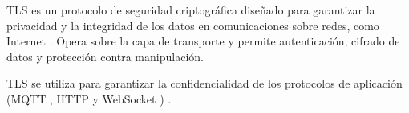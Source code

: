 


TLS es un protocolo de seguridad criptográfica diseñado para garantizar la
privacidad y la integridad de los datos en comunicaciones sobre redes, como
Internet \cite{tls}. Opera sobre la capa de transporte y permite autenticación,
cifrado de datos y protección contra manipulación.

TLS se utiliza para garantizar la confidencialidad de los protocolos de
aplicación (MQTT \cite{OASIS_MQTT_Standard}, HTTP \cite{IBMTCPIP} y WebSocket
\cite{RFC6455}) \cite{awsiot_tls}.






